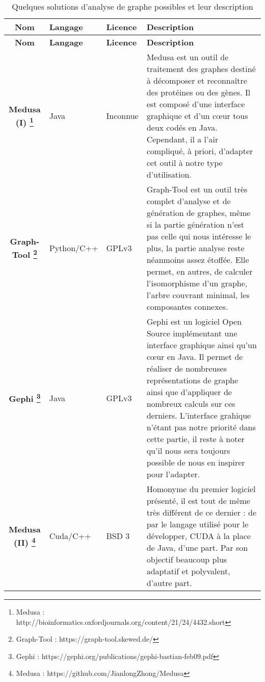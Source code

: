   \begin{longtable}{|c|p{2cm}|p{2cm}|p{8cm}|}
    \caption{Quelques solutions d'analyse de graphe possibles et leur description}\\
    \hline
    \textbf{Nom} & \textbf{Langage} & \textbf{Licence} & \textbf{Description} \\
    \hline \hline
    
    \endfirsthead
    \hline
    \textbf{Nom} & \textbf{Langage} & \textbf{Licence} & \textbf{Description} \\
    \hline \hline
    
    \endhead
	
    \textbf{Medusa (I) \footnote{Medusa :  http://bioinformatics.oxfordjournals.org/content/21/24/4432.short}} & Java & Inconnue & Medusa est un outil de traitement des graphes destiné à décomposer et reconnaître des protéines ou des gènes. Il est composé d'une interface graphique et d'un c\oe{}ur tous deux codés en Java. Cependant, il a l'air compliqué, à priori, d'adapter cet outil à notre type d'utilisation.\\
    \hline
    \textbf{Graph-Tool \footnote{Graph-Tool : https://graph-tool.skewed.de/}}& Python/C++ & GPLv3 &  Graph-Tool est un outil très complet d'analyse et de génération de graphes, même si la partie génération n'est pas celle qui nous intéresse le plus, la partie analyse reste néanmoins assez étoffée. Elle permet, en autres, de calculer l'isomorphisme d'un graphe, l'arbre couvrant minimal, les composantes connexes. \\
    \hline
    \textbf{Gephi \footnote{Gephi :  https://gephi.org/publications/gephi-bastian-feb09.pdf}}& Java &  GPLv3 & Gephi est un logiciel Open Source implémentant une interface graphique ainsi qu'un c\oe{}ur en Java. Il permet de réaliser de nombreuses représentations de graphe ainsi que d'appliquer de nombreux calculs sur ces derniers. L'interface grahique n'étant pas notre priorité dans cette partie, il reste à noter qu'il nous sera toujours possible de nous en inspirer pour l'adapter. \\
    \hline
    \textbf{Medusa (II) \footnote{Medusa :  https://github.com/JianlongZhong/Medusa}}& Cuda/C++ &  BSD 3 & Homonyme du premier logiciel présenté, il est tout de même très différent de ce dernier : de par le langage utilisé pour le développer, CUDA à la place de Java, d'une part. Par son objectif beaucoup plus adaptatif et polyvalent, d'autre part. \\
    \hline
  \end{longtable}
  
